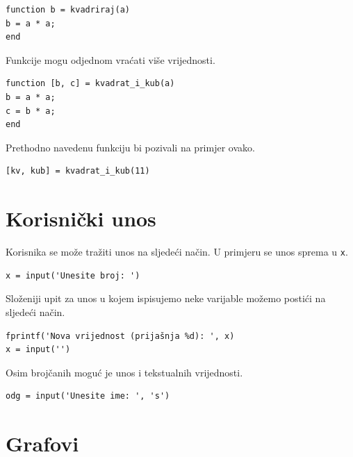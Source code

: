 \documentclass[a4paper, 10pt]{article}
\newcommand{\spec}[1]{\texttt{#1}} %
\begin{document}
\begin{lstlisting}
function b = kvadriraj(a)
b = a * a;
end
\end{lstlisting}

Funkcije mogu odjednom vraćati više vrijednosti.

\begin{lstlisting}
function [b, c] = kvadrat_i_kub(a)
b = a * a;
c = b * a;
end
\end{lstlisting}

Prethodno navedenu funkciju bi pozivali na primjer ovako.

\begin{lstlisting}
[kv, kub] = kvadrat_i_kub(11)
\end{lstlisting}


\section{Korisnički unos}

Korisnika se može tražiti unos na sljedeći način.
U primjeru se unos sprema u \spec{x}.

\begin{lstlisting}
x = input('Unesite broj: ')
\end{lstlisting}

Složeniji upit za unos u kojem ispisujemo neke varijable možemo postići na sljedeći način.

\begin{lstlisting}
fprintf('Nova vrijednost (prijašnja %d): ', x)
x = input('')
\end{lstlisting}

Osim brojčanih moguć je unos i tekstualnih vrijednosti.

\begin{lstlisting}
odg = input('Unesite ime: ', 's')
\end{lstlisting}


\section{Grafovi}
\end{document}
